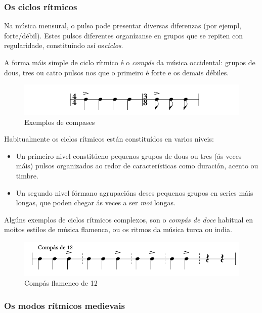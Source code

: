 \documentclass[a4paper, twoside]{templates/ociamthesis}
\providecommand{\tightlist}{%
  \setlength{\itemsep}{0pt}\setlength{\parskip}{0pt}}
\begin{document}
\hypertarget{os-ciclos-ruxedtmicos}{%
\subsubsection{Os ciclos rítmicos}\label{os-ciclos-ruxedtmicos}}

Na música mensural, o pulso pode presentar diversas diferenzas (por ejempl, forte/débil). Estes pulsos diferentes organízanse en grupos que se repiten con regularidade, constituíndo así os\emph{ciclos}.

A forma máis simple de ciclo rítmico é o \emph{compás} da música occidental: grupos de dous, tres ou catro pulsos nos que o primeiro é forte e os demais débiles.

\begin{figure}
\centering
\includegraphics{figures/ud-03/compases.png}
\caption{Exemplos de compases}
\end{figure}

Habitualmente os ciclos rítmicos están constituídos en varios niveis:

\begin{itemize}
\tightlist
\item
  Un primeiro nivel constitúeno pequenos grupos de dous ou tres (ás veces máis) pulsos organizados ao redor de características como duración, acento ou timbre.
\item
  Un segundo nivel fórmano agrupacións deses pequenos grupos en series máis longas, que poden chegar ás veces a ser \emph{moi} longas.
\end{itemize}

Algúns exemplos de ciclos rítmicos complexos, son o \emph{compás de doce} habitual en moitos estilos de música flamenca, ou os ritmos da música turca ou india.

\begin{figure}
\centering
\includegraphics{figures/ud-03/ciclos-1.png}
\caption{Compás flamenco de 12}
\end{figure}

\hypertarget{os-modos-ruxedtmicos-medievais}{%
\subsubsection*{Os modos rítmicos medievais}\label{os-modos-ruxedtmicos-medievais}}
\end{document}
